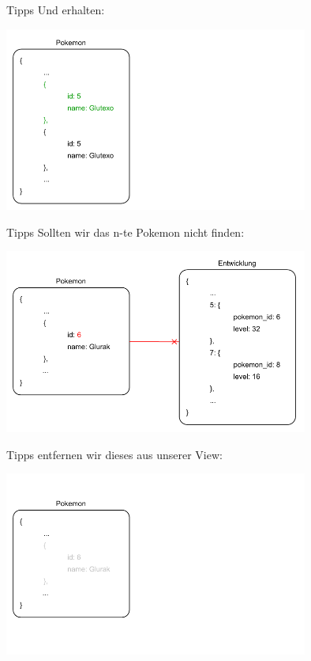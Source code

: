 \begin{frame}{Tipps}
    Und erhalten:

    \begin{center}
        \includegraphics[width=0.75\textwidth]{pictures/example_5.pdf}
    \end{center}
\end{frame}

\begin{frame}{Tipps}
    Sollten wir das n-te Pokemon nicht finden:

    \begin{center}
        \includegraphics[width=0.75\textwidth]{pictures/example_6.pdf}
    \end{center}
\end{frame}

\begin{frame}{Tipps}
    entfernen wir dieses aus unserer View:

    \begin{center}
        \includegraphics[width=0.75\textwidth]{pictures/example_7.pdf}
    \end{center}
\end{frame}